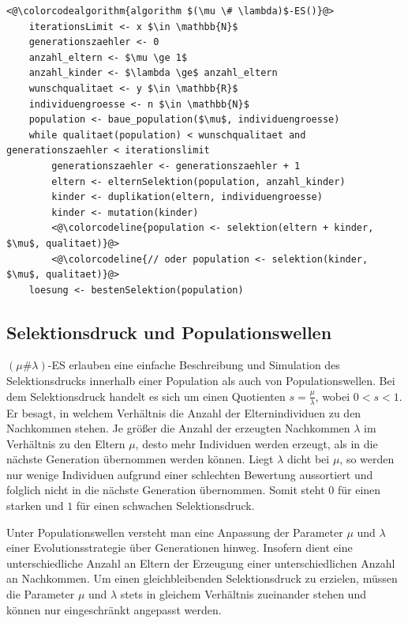 \begin{lstlisting}[caption={$(\mu \# \lambda)$-Evolutionsstrategie}, firstnumber=1, captionpos=b, label=lst:mu_hash_lambda_es]
<@\colorcodealgorithm{algorithm $(\mu \# \lambda)$-ES()}@>
	iterationsLimit <- x $\in \mathbb{N}$
	generationszaehler <- 0
	anzahl_eltern <- $\mu \ge 1$
	anzahl_kinder <- $\lambda \ge$ anzahl_eltern
	wunschqualitaet <- y $\in \mathbb{R}$
	individuengroesse <- n $\in \mathbb{N}$
	population <- baue_population($\mu$, individuengroesse)
	while qualitaet(population) < wunschqualitaet and generationszaehler < iterationslimit
		generationszaehler <- generationszaehler + 1
		eltern <- elternSelektion(population, anzahl_kinder)
		kinder <- duplikation(eltern, individuengroesse)
		kinder <- mutation(kinder)
		<@\colorcodeline{population <- selektion(eltern + kinder, $\mu$, qualitaet)}@>
		<@\colorcodeline{// oder population <- selektion(kinder, $\mu$, qualitaet)}@>
	loesung <- bestenSelektion(population)
\end{lstlisting}

\subsection{Selektionsdruck und Populationswellen}

$(\mu \# \lambda)$-ES erlauben eine einfache Beschreibung und Simulation des Selektionsdrucks innerhalb einer Population als auch von Populationswellen.
Bei dem Selektionsdruck handelt es sich um einen Quotienten $s = \frac{\mu}{\lambda}$, wobei $0 < s < 1$.
Er besagt, in welchem Verhältnis die Anzahl der Elternindividuen zu den Nachkommen stehen.
Je größer die Anzahl der erzeugten Nachkommen $\lambda$ im Verhältnis zu den Eltern $\mu$, desto mehr Individuen werden erzeugt, als in die nächste Generation übernommen werden können.
Liegt $\lambda$ dicht bei $\mu$, so werden nur wenige Individuen aufgrund einer schlechten Bewertung aussortiert und folglich nicht in die nächste Generation übernommen.
Somit steht $0$ für einen starken und $1$ für einen schwachen Selektionsdruck.

Unter Populationswellen versteht man eine Anpassung der Parameter $\mu$ und $\lambda$ einer Evolutionsstrategie über Generationen hinweg. Insofern dient eine unterschiedliche Anzahl an Eltern der Erzeugung einer unterschiedlichen Anzahl an Nachkommen.
Um einen gleichbleibenden Selektionsdruck zu erzielen, müssen die Parameter $\mu$ und $\lambda$ stets in gleichem Verhältnis zueinander stehen und können nur eingeschränkt angepasst werden.

